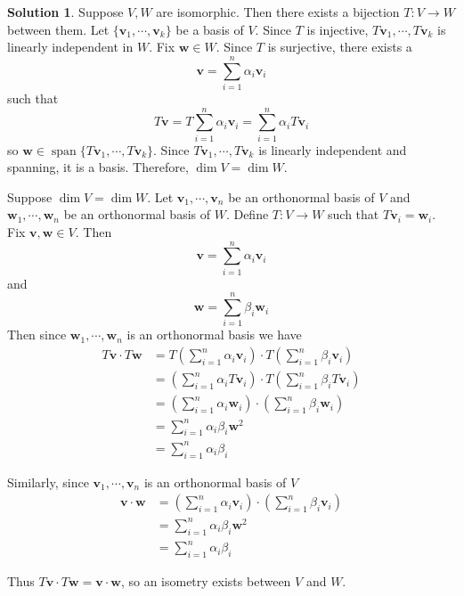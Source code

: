 \documentclass[11pt]{article}
\theoremstyle{definition}
\newtheorem*{solution}{Solution}
\DeclareMathOperator{\spn}{span}
\newcommand{\vv}{\mathbf{v}}
\newcommand{\vw}{\mathbf{w}}
\begin{document}
    \begin{solution}
        Suppose $V, W$ are isomorphic. Then there exists a bijection $T:V \to W$ between them. Let $\{\vv_1, \cdots, \vv_k\}$ be a basis of $V$. Since $T$ is injective, $T\vv_1, \cdots, T\vv_k$ is linearly independent in $W$. Fix $\vw \in W$. Since $T$ is surjective, there exists a $$\vv = \sum_{i = 1}^n \alpha_i \vv_i$$such that $$T\vv = T\sum_{i = 1}^n \alpha_i \vv_i = \sum_{i = 1}^n \alpha_i T\vv_i$$so $\vw \in \spn \{T\vv_1, \cdots, T\vv_k\}$. Since $T\vv_1, \cdots, T\vv_k$ is linearly independent and spanning, it is a basis. Therefore, $\dim V = \dim W$.

        Suppose $\dim V = \dim W$. Let $\vv_1, \cdots, \vv_n$ be an orthonormal basis of $V$ and $\vw_1, \cdots, \vw_n$ be an orthonormal basis of $W$. Define $T:V \to W$ such that $T\vv_i = \vw_i$. Fix $\vv, \vw \in V$. Then $$\vv = \sum_{i = 1}^n \alpha_i \vv_i$$and $$\vw = \sum_{i = 1}^n \beta_i \vw_i$$Then since $\vw_1, \cdots, \vw_n$ is an orthonormal basis we have
        \begin{align*}
            T\vv \cdot T\vw &= T\left(\sum_{i = 1}^n \alpha_i \vv_i\right) \cdot T\left(\sum_{i = 1}^n \beta_i \vv_i\right)\\
            &= \left(\sum_{i = 1}^n \alpha_i T\vv_i\right) \cdot T\left(\sum_{i = 1}^n \beta_i T\vv_i\right)\\
            &= \left(\sum_{i = 1}^n \alpha_i \vw_i\right) \cdot \left(\sum_{i = 1}^n \beta_i \vw_i\right)\\
            &= \sum_{i = 1}^n \alpha_i\beta_i\vw^2\\
            &= \sum_{i = 1}^n \alpha_i\beta_i
        \end{align*}

        Similarly, since $\vv_1, \cdots, \vv_n$ is an orthonormal basis of $V$
        \begin{align*}
            \vv \cdot \vw &= \left(\sum_{i = 1}^n \alpha_i \vv_i\right) \cdot \left(\sum_{i = 1}^n \beta_i \vv_i\right)\\
            &= \sum_{i = 1}^n \alpha_i\beta_i\vw^2\\
            &= \sum_{i = 1}^n \alpha_i\beta_i
        \end{align*}

        Thus $T\vv \cdot T\vw = \vv \cdot \vw$, so an isometry exists between $V$ and $W$.
    \end{solution}
\end{document}
